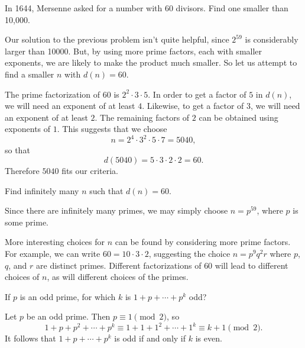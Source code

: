  In 1644, Mersenne asked for a number with $60$
divisors. Find one smaller than 10,000.
\begin{solution}
  Our solution to the previous problem isn't quite helpful, since
  $2^{59}$ is considerably larger than 10000. But, by using more prime
  factors, each with smaller exponents, we are likely to make the
  product much smaller. So let us attempt to find a smaller $n$ with
  $d(n) = 60$.

  The prime factorization of $60$ is $2^2\cdot3\cdot5$. In order to
  get a factor of $5$ in $d(n)$, we will need an exponent of at least
  $4$. Likewise, to get a factor of $3$, we will need an exponent of
  at least $2$. The remaining factors of $2$ can be obtained using
  exponents of $1$. This suggests that we choose
  \begin{equation*}
    n = 2^4\cdot3^2\cdot5\cdot7 = 5040,
  \end{equation*}
  so that
  \begin{equation*}
    d(5040) = 5\cdot3\cdot2\cdot2 = 60.
  \end{equation*}
  Therefore $5040$ fits our criteria.
\end{solution}

 Find infinitely many $n$ such that $d(n) = 60$.
\begin{solution}
  Since there are infinitely many primes, we may simply choose
  $n = p^{59}$, where $p$ is some prime.

  More interesting choices for $n$ can be found by considering more
  prime factors. For example, we can write $60 = 10\cdot3\cdot2$,
  suggesting the choice $n = p^9q^2r$ where $p$, $q$, and $r$ are
  distinct primes. Different factorizations of $60$ will lead to
  different choices of $n$, as will different choices of the primes.
\end{solution}

 If $p$ is an odd prime, for which $k$ is
$1 + p + \cdots + p^k$ odd?
\begin{solution}
  Let $p$ be an odd prime. Then $p\equiv1\pmod{2}$, so
  \begin{equation*}
    1 + p + p^2 + \cdots + p^k \equiv 1 + 1 + 1^2 + \cdots + 1^k
    \equiv k+1 \pmod{2}.
  \end{equation*}
  It follows that $1 + p + \cdots + p^k$ is odd if and only if $k$ is
  even.
\end{solution}

